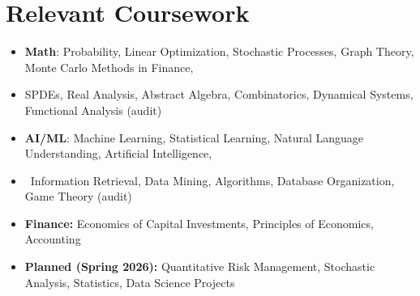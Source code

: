 \documentclass[letterpaper,10pt]{article}
\newcommand\vspacesize{-10pt}
\newcommand{\resumeSubHeadingListStart}{\begin{itemize}[leftmargin=0.15in, label=]}
\newcommand{\resumeSubHeadingListEnd}{\end{itemize}}
\begin{document}
\vspace{\vspacesize}

\section{Relevant Coursework}
\resumeSubHeadingListStart
    \item \textbf{Math}: Probability, Linear Optimization, Stochastic Processes, Graph Theory, Monte Carlo Methods in Finance, \vspace{-5pt}
    \item \qquad\quad\;\! SPDEs, Real Analysis, Abstract Algebra, Combinatorics, Dynamical Systems, Functional Analysis (audit) \vspace{-5pt}
    \item \textbf{AI/ML}: Machine Learning, Statistical Learning, Natural Language Understanding, Artificial Intelligence, \vspace{-5pt}
    \item \qquad\qquad\ Information Retrieval, Data Mining, Algorithms, Database Organization, Game Theory (audit) \vspace{-5pt}
    \item \textbf{Finance:} Economics of Capital Investments, Principles of Economics, Accounting \vspace{-5pt}
    \item \textbf{Planned (Spring 2026):} Quantitative Risk Management, Stochastic Analysis, Statistics, Data Science Projects \vspace{-5pt}
\resumeSubHeadingListEnd
\end{document}
